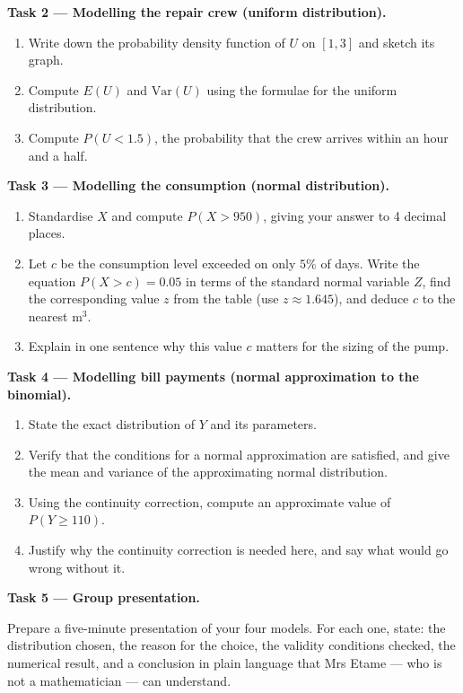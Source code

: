 \documentclass[11pt]{article}
\begin{document}
\textbf{Task 2 — Modelling the repair crew (uniform distribution).}\par
\begin{enumerate}
\item Write down the probability density function of $U$ on $[1,3]$ and sketch its graph.
\item Compute $E(U)$ and $\mathrm{Var}(U)$ using the formulae for the uniform distribution.
\item Compute $P(U<1.5)$, the probability that the crew arrives within an hour and a half.
\end{enumerate}

\textbf{Task 3 — Modelling the consumption (normal distribution).}\par
\begin{enumerate}
\item Standardise $X$ and compute $P(X>950)$, giving your answer to 4 decimal places.
\item Let $c$ be the consumption level exceeded on only $5\%$ of days. Write the equation $P(X>c)=0.05$ in terms of the standard normal variable $Z$, find the corresponding value $z$ from the table (use $z\approx 1.645$), and deduce $c$ to the nearest $\mathrm{m^3}$.
\item Explain in one sentence why this value $c$ matters for the sizing of the pump.
\end{enumerate}

\textbf{Task 4 — Modelling bill payments (normal approximation to the binomial).}\par
\begin{enumerate}
\item State the exact distribution of $Y$ and its parameters.
\item Verify that the conditions for a normal approximation are satisfied, and give the mean and variance of the approximating normal distribution.
\item Using the continuity correction, compute an approximate value of $P(Y\geq 110)$.
\item Justify why the continuity correction is needed here, and say what would go wrong without it.
\end{enumerate}

\textbf{Task 5 — Group presentation.}\par
Prepare a five-minute presentation of your four models. For each one, state: the distribution chosen, the reason for the choice, the validity conditions checked, the numerical result, and a conclusion in plain language that Mrs Etame — who is not a mathematician — can understand.
\end{document}
